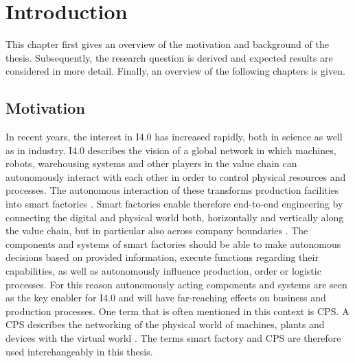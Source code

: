 \chapter{Introduction}
This chapter first gives an overview of the motivation and background of the thesis. Subsequently, the research question is derived and expected results are considered in more detail. Finally, an overview of the following chapters is given.
\section{Motivation}
In recent years, the interest in \ac{I4.0} has increased rapidly, both in science as well as in industry. \ac{I4.0} describes the vision of a global network in which machines, robots, warehousing systems and other players in the value chain can autonomously interact with each other in order to control physical resources and processes. The autonomous interaction of these transforms production facilities into smart factories \cite[p.20]{Acatech2013Recommendations4.0}. Smart factories enable therefore end-to-end engineering by connecting the digital and physical world both, horizontally and vertically along the value chain, but in particular also across company boundaries \cite[p.20]{Acatech2013Recommendations4.0} \cite[p.859]{Uslander2015ReferenceApproach}. The components and systems of smart factories should be able to make autonomous decisions based on provided information, execute functions regarding their capabilities, as well as autonomously influence production, order or logistic processes. For this reason autonomously acting components and systems are seen as the key enabler for \ac{I4.0} and will have far-reaching effects on business and production processes. One term that is often mentioned in this context is \ac{CPS}. A \ac{CPS} describes the networking of the physical world of machines, plants and devices with the virtual world \cite{Lee2008CyberBerkeley}. The terms smart factory and \ac{CPS} are therefore used interchangeably in this thesis.

